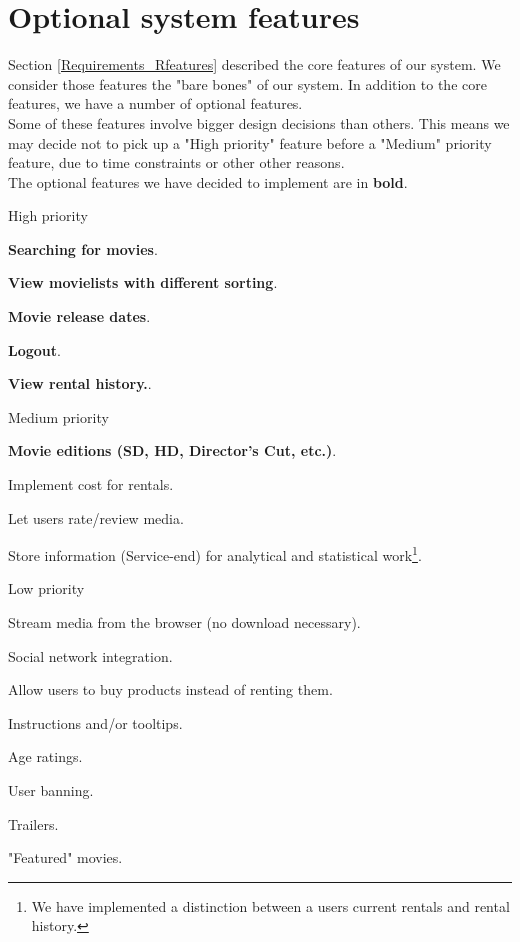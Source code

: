 \section{Optional system features}
\label{Requirements_Ofeatures}
Section \ref{Requirements_Rfeatures} described the core features of our system. We consider those features the "bare bones" of our system. In addition to the core features, we have a number of optional features. 
\\Some of these features involve bigger design decisions than others. This means we may decide not to pick up a "High priority" feature before a "Medium" priority feature, due to time constraints or other other reasons.
\\The optional features we have decided to implement are in \textbf{bold}.
\begin{my_itemize}
	\item High priority
	\begin{my_itemize}
		\item \textbf{Searching for movies}.
		\item \textbf{View movielists with different sorting}.
		\item \textbf{Movie release dates}.
		\item \textbf{Logout}.
		\item \textbf{View rental history.}.
	\end{my_itemize}
	\item Medium priority
	\begin{my_itemize}
		\item \textbf{Movie editions (SD, HD, Director's Cut, etc.)}.
		\item Implement cost for rentals.
		\item Let users rate/review media.
		\item Store information (Service-end) for analytical and statistical work\footnote{We have implemented a distinction between a users current rentals and rental history.}.
	\end{my_itemize}
	\item Low priority
	\begin{my_itemize}
		\item Stream media from the browser (no download necessary).
		\item Social network integration.
		\item Allow users to buy products instead of renting them.
		\item Instructions and/or tooltips.
 		\item Age ratings.
		\item User banning.
		\item Trailers.
		\item "Featured" movies.
	\end{my_itemize}
\end{my_itemize}

